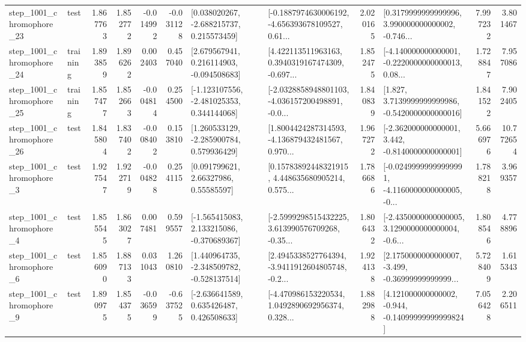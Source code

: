 \begin{tabular}{llrrrrllrlrr}
 step\_1001\_chromophore\_23 &      test &      1.867763 &    1.852772 &     -0.014992 & -0.031128 &    [0.038020267, -2.688215737, 0.215573459] &  [-0.1887974630006192, -4.656393678109527, 0.61... &       2.020165 &  [0.3179999999999996, 3.990000000000002, -0.746... &            7.997232 &          3.801467 \\
 step\_1001\_chromophore\_24 &  training &      1.893859 &    1.896262 &      0.002403 &  0.457040 &    [2.679567941, 0.216114903, -0.094508683] &  [4.422113511963163, 0.3940319167474309, -0.697... &       1.852475 &  [-4.140000000000001, -0.2220000000000013, 0.08... &            1.728847 &          7.957086 \\
 step\_1001\_chromophore\_25 &  training &      1.857477 &    1.852663 &     -0.004814 &  0.254500 &   [-1.123107556, -2.481025353, 0.344144068] &  [-2.0328858948801103, -4.036157200498891, -0.0... &       1.840839 &   [1.827, 3.7139999999999986, -0.5420000000000016] &            1.841522 &          7.902405 \\
 step\_1001\_chromophore\_26 &      test &      1.845804 &    1.837402 &     -0.008402 &  0.153810 &    [1.260533129, -2.285900784, 0.579936429] &  [1.8004424287314593, -4.136879432481567, 0.970... &       1.967272 &   [-2.362000000000001, 3.442, -0.8140000000000001] &            5.666976 &         10.772654 \\
  step\_1001\_chromophore\_3 &      test &      1.927547 &    1.922719 &     -0.004828 &  0.254115 &       [0.091799621, 2.66327986, 0.55585597] &  [0.15783892448321915, 4.448635680905214, 0.575... &       1.786686 &  [-0.02499999999999991, -4.1160000000000005, -0... &            1.788218 &          3.969357 \\
  step\_1001\_chromophore\_4 &      test &      1.855545 &    1.863027 &      0.007481 &  0.599557 &   [-1.565415083, 2.133215086, -0.370689367] &  [-2.5999298515432225, 3.613990576709268, -0.35... &       1.806432 &  [-2.4350000000000005, 3.1290000000000004, -0.6... &            1.808546 &          4.778896 \\
  step\_1001\_chromophore\_6 &      test &      1.856090 &    1.887133 &      0.031043 &  1.260810 &   [1.440964735, -2.348509782, -0.528137514] &  [2.4945338527764394, -3.9411912604805748, -0.2... &       1.924138 &  [2.1750000000000007, -3.499, -0.36999999999999... &            5.728409 &          1.615343 \\
  step\_1001\_chromophore\_9 &      test &      1.890975 &    1.854375 &     -0.036599 & -0.637525 &    [-2.636641589, 0.635426487, 0.426508633] &  [-4.470986153220534, 1.0492890692956374, 0.328... &       1.882988 &  [4.121000000000002, -0.944, -0.14099999999999824] &            7.056428 &          2.206511 \\

\end{tabular}
